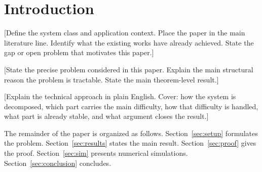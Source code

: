\section{Introduction}

[Define the system class and application context. Place the paper in the
main literature line. Identify what the existing works have already
achieved. State the gap or open problem that motivates this paper.]

[State the precise problem considered in this paper. Explain the main
structural reason the problem is tractable. State the main theorem-level
result.]

[Explain the technical approach in plain English. Cover: how the system
is decomposed, which part carries the main difficulty, how that difficulty
is handled, what part is already stable, and what argument closes the
result.]

The remainder of the paper is organized as follows.
Section~\ref{sec:setup} formulates the problem.
Section~\ref{sec:results} states the main result.
Section~\ref{sec:proof} gives the proof.
Section~\ref{sec:sim} presents numerical simulations.
Section~\ref{sec:conclusion} concludes.
